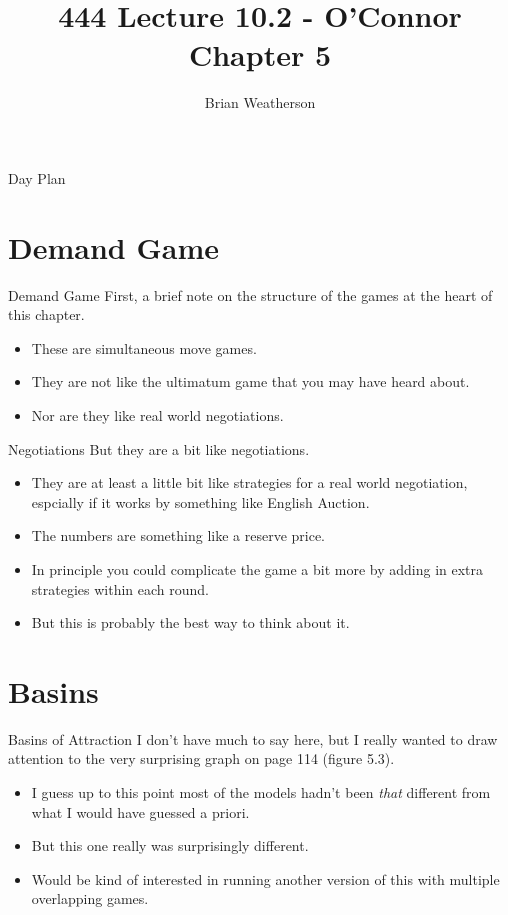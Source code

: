 \documentclass[
  ignorenonframetext,
]{beamer}
\title{444 Lecture 10.2 - O'Connor Chapter 5}
\author{Brian Weatherson}
\date{}
\providecommand{\tightlist}{%
  \setlength{\itemsep}{0pt}\setlength{\parskip}{0pt}}
\begin{document}
\frame{\titlepage}

\begin{frame}{Day Plan}
\protect\hypertarget{day-plan}{}
\tableofcontents
\end{frame}

\hypertarget{demand-game}{%
\section{Demand Game}\label{demand-game}}

\begin{frame}{Demand Game}
\protect\hypertarget{demand-game-1}{}
First, a brief note on the structure of the games at the heart of this
chapter.

\begin{itemize}
\tightlist
\item
  These are simultaneous move games.
\item
  They are not like the ultimatum game that you may have heard about.
\item
  Nor are they like real world negotiations.
\end{itemize}
\end{frame}

\begin{frame}{Negotiations}
\protect\hypertarget{negotiations}{}
But they are a bit like negotiations.

\begin{itemize}
\tightlist
\item
  They are at least a little bit like strategies for a real world
  negotiation, espcially if it works by something like English Auction.
\item
  The numbers are something like a reserve price.
\item
  In principle you could complicate the game a bit more by adding in
  extra strategies within each round.
\item
  But this is probably the best way to think about it.
\end{itemize}
\end{frame}

\hypertarget{basins}{%
\section{Basins}\label{basins}}

\begin{frame}{Basins of Attraction}
\protect\hypertarget{basins-of-attraction}{}
I don't have much to say here, but I really wanted to draw attention to
the very surprising graph on page 114 (figure 5.3).

\begin{itemize}
\tightlist
\item
  I guess up to this point most of the models hadn't been \emph{that}
  different from what I would have guessed a priori.
\item
  But this one really was surprisingly different.
\item
  Would be kind of interested in running another version of this with
  multiple overlapping games.
\end{itemize}
\end{frame}
\end{document}
